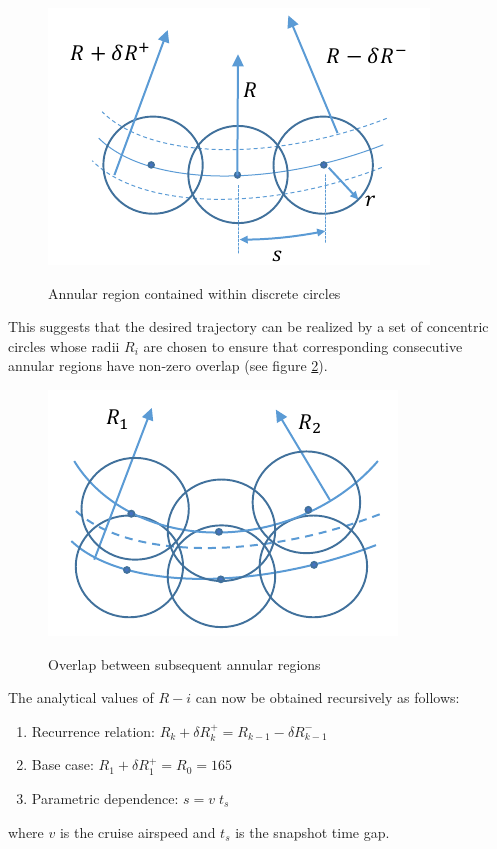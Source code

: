 \begin{figure}
\centering
\includegraphics[scale=1]{Figures/mission_phase1_a}
\label{fig_mission_phase1_a}
\caption{Annular region contained within discrete circles}
\end{figure}

This suggests that the desired trajectory can be realized by a set of concentric circles whose radii $R_i$ are chosen to ensure that corresponding consecutive annular regions have non-zero overlap (see figure \ref{fig_mission_phase1_b}).

\begin{figure}
\centering
\includegraphics[scale=1]{Figures/mission_phase1_b}
\label{fig_mission_phase1_b}
\caption{Overlap between subsequent annular regions}
\end{figure}

The analytical values of $R-i$ can now be obtained recursively as follows:
\begin{enumerate}
\item Recurrence relation: $ R_k + \delta R_k^+ = R_{k-1} - \delta R_{k-1}^-$
\item Base case: $ R_1 + \delta R_1^+ = R_0 = 165$
\item Parametric dependence: $s=v \; t_s$
\end{enumerate}
where $v$ is the cruise airspeed and $t_s$ is the snapshot time gap. 
 
